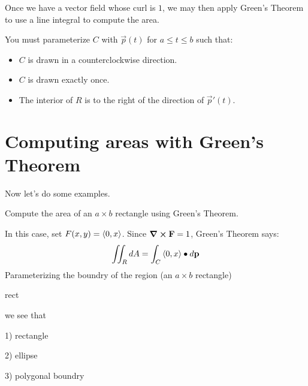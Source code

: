 \documentclass{ximera}
\begin{document}
Once we have a vector field whose curl is $1$, we may then apply
Green's Theorem to use a line integral to compute the area.

\begin{warning}
  You must parameterize $C$ with $\vec{p}(t)$ for $a\le t\le b$ such that:
  \begin{itemize}
    \item $C$ is drawn in a counterclockwise direction.
    \item $C$ is drawn exactly once.
    \item The interior of $R$ is to the right of the direction of
      $\vec{p}'(t)$.
  \end{itemize}
\end{warning}




\section{Computing areas with Green's Theorem}

Now let's do some examples.

\begin{example}
  Compute the area of an $a\times b$ rectangle using Green's Theorem.
  \begin{explanation}
    In this case, set $F(x,y) = \left\langle 0,x\right\rangle$. Since $\boldsymbol\nabla\boldsymbol\times\mathbf{F} =
    1$, Green's Theorem says:
    \[
    \iint_R \mathop{}\!d A  = \int_C \left\langle 0,x\right\rangle\bullet\mathop{}\!d\mathbf{p}
    \]
    Parameterizing the boundry of the region (an $a\times b$
    rectangle)
    \begin{image}
      rect
    \end{image}
    we see that 
    
  \end{explanation}
\end{example}


1) rectangle

2) ellipse

3) polygonal boundry
\end{document}
